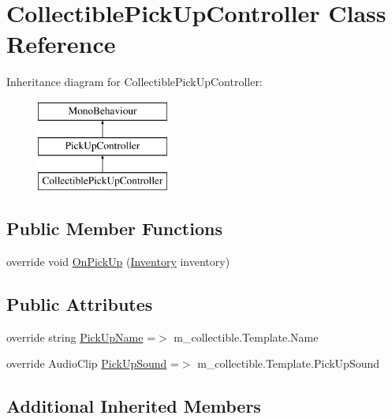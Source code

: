 \hypertarget{class_collectible_pick_up_controller}{}\section{Collectible\+Pick\+Up\+Controller Class Reference}
\label{class_collectible_pick_up_controller}
Inheritance diagram for Collectible\+Pick\+Up\+Controller\+:\begin{figure}[H]
\begin{center}
\leavevmode
\includegraphics[height=3.000000cm]{class_collectible_pick_up_controller}
\end{center}
\end{figure}
\subsection*{Public Member Functions}
\begin{DoxyCompactItemize}
\item 
override void \mbox{\hyperlink{class_collectible_pick_up_controller_af2d0389e1d3428399dcffed2df169b6f}{On\+Pick\+Up}} (\mbox{\hyperlink{class_inventory}{Inventory}} inventory)
\end{DoxyCompactItemize}
\subsection*{Public Attributes}
\begin{DoxyCompactItemize}
\item 
override string \mbox{\hyperlink{class_collectible_pick_up_controller_ae8bfc0bc3fa5c7943656d06f7961707d}{Pick\+Up\+Name}} =$>$ m\+\_\+collectible.\+Template.\+Name
\item 
override Audio\+Clip \mbox{\hyperlink{class_collectible_pick_up_controller_a66690b993178b2b5fb6c192a56b2dddf}{Pick\+Up\+Sound}} =$>$ m\+\_\+collectible.\+Template.\+Pick\+Up\+Sound
\end{DoxyCompactItemize}
\subsection*{Additional Inherited Members}


